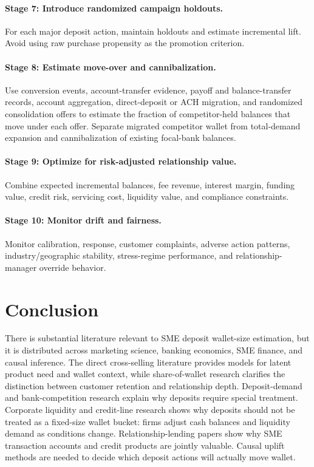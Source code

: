 \documentclass[11pt]{article}
\begin{document}
\paragraph{Stage 7: Introduce randomized campaign holdouts.}
For each major deposit action, maintain holdouts and estimate incremental lift.
Avoid using raw purchase propensity as the promotion criterion.

\paragraph{Stage 8: Estimate move-over and cannibalization.}
Use conversion events, account-transfer evidence, payoff and balance-transfer
records, account aggregation, direct-deposit or ACH migration, and randomized
consolidation offers to estimate the fraction of competitor-held balances that
move under each offer. Separate migrated competitor wallet from total-demand
expansion and cannibalization of existing focal-bank balances.

\paragraph{Stage 9: Optimize for risk-adjusted relationship value.}
Combine expected incremental balances, fee revenue, interest margin, funding
value, credit risk, servicing cost, liquidity value, and compliance constraints.

\paragraph{Stage 10: Monitor drift and fairness.}
Monitor calibration, response, customer complaints, adverse action patterns,
industry/geographic stability, stress-regime performance, and
relationship-manager override behavior.

\section{Conclusion}

There is substantial literature relevant to SME deposit wallet-size estimation,
but it is distributed across marketing science, banking economics, SME finance,
and causal inference. The direct cross-selling literature provides models for
latent product need and wallet context, while share-of-wallet research clarifies
the distinction between customer retention and relationship depth.
Deposit-demand and bank-competition research explain why deposits require
special treatment. Corporate liquidity and credit-line research shows why
deposits should not be treated as a fixed-size wallet bucket: firms adjust cash
balances and liquidity demand as conditions change. Relationship-lending papers
show why SME transaction accounts and credit products are jointly valuable.
Causal uplift methods are needed to decide which deposit actions will actually
move wallet.
\end{document}
